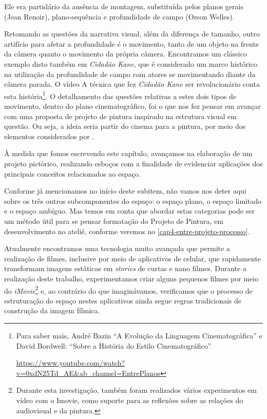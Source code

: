Ele era partidário da ausência de montagem, substituída pelos planos
gerais (Jean Renoir), plano-sequência e profundidade de campo (Orson
Welles).

Retomando as questões da narrativa visual, além da diferença de
tamanho, outro artifício para afetar a profundidade é o movimento,
tanto de um objeto na frente da câmera quanto o movimento da própria
câmera. Encontramos um clássico exemplo disto também em \emph{Cidadão
	Kane}, que é considerado um marco histórico na utilização da
profundidade de campo com atores se movimentando diante da câmera
parada. O vídeo A técnica que fez \emph{Cidadão Kane} ser
revolucionário conta esta história\footnote{Para saber mais, André
	Bazin \enquote{A Evolução da Linguagem Cinematográfica} e David
	Bordwell: \enquote{Sobre a História do Estilo Cinematográfico}

	\url{https://www.youtube.com/watch?v=0xdN25Td_AE\&ab_channel=EntrePlanos}}.
O detalhamento das questões relativas a estes dois tipos de movimento,
dentro do plano cinematográfico, foi o que nos fez pensar em avançar com
uma proposta de projeto de pintura inspirado na estrutura visual em
questão. Ou seja, a ideia seria partir do cinema para a pintura, por
meio dos elementos considerados por \citeauthor{block2021visual}.

\pagebreak

À medida que fomos escrevendo este capítulo, avançamos na elaboração de
um projeto pictórico, realizando esboços com a finalidade de evidenciar
aplicações dos principais conceitos relacionados ao espaço.

Conforme já mencionamos no início deste subitem, não vamos nos deter
aqui sobre os três outros subcomponentes do espaço: o espaço plano, o
espaço limitado e o espaço ambíguo. Mas temos em conta que abordar
estas categorias pode ser um método útil para se pensar formatação do
Projeto de Pintura, em desenvolvimento no ateliê, conforme veremos no
\cref{cap4-entre-projeto-processo}.

Atualmente encontramos uma tecnologia muito avançada que permite a
realização de filmes, inclusive por meio de aplicativos de celular, que
rapidamente transformam imagens estáticas em \emph{stories} de curtas e
nano filmes. Durante a realização deste trabalho, experimentamos criar
alguns pequenos filmes por meio do \emph{iMovie}\footnote{Durante esta
	investigação, também foram realizados vários experimentos em vídeo com
	o Imovie, como suporte para as reflexões sobre as relações do
	audiovisual e da pintura.} e, ao contrário do que imaginávamos,
verificamos que o processo de estruturação do espaço nestes aplicativos
ainda segue regras tradicionais de construção da imagem fílmica.


